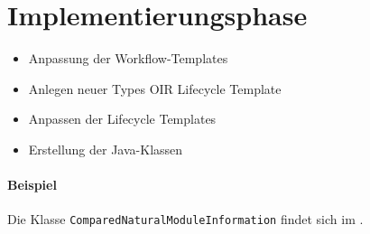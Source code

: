 \section{Implementierungsphase}  %
\label{sec:Implementierungsphase}


\begin{itemize}
	\item Anpassung der Workflow-Templates
	\item Anlegen neuer Types
	\subitem OIR
	\subitem Lifecycle Template
	\item Anpassen der Lifecycle Templates
	\item Erstellung der Java-Klassen
\end{itemize}

\paragraph{Beispiel}
Die Klasse \texttt{Com\-par\-ed\-Na\-tu\-ral\-Mo\-dule\-In\-for\-ma\-tion} findet sich im .  
